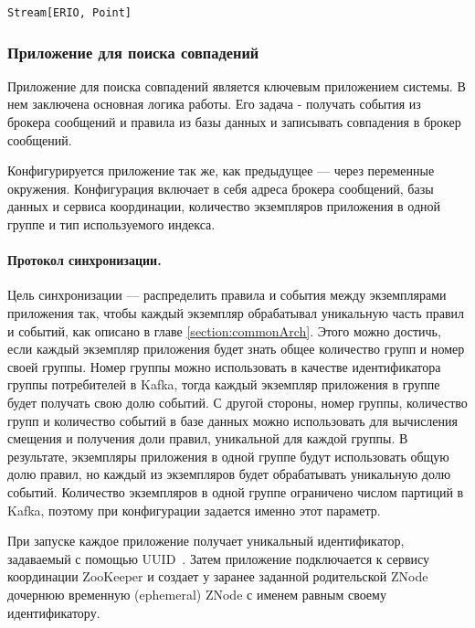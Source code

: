 \documentclass[14pt]{article}
\begin{document}
\begin{lstlisting}[style=scalaStyle,caption={Тип, описывающий поток событий.},label={listing:pointsStream},captionpos=b, float]
Stream[ERIO, Point]
\end{lstlisting}

\subsubsection{Приложение для поиска совпадений}
\label{section:classifier}

Приложение для поиска совпадений является ключевым приложением системы. В нем заключена основная логика работы. Его задача - получать события из брокера сообщений и правила из базы данных и записывать совпадения в брокер сообщений.

Конфигурируется приложение так же, как предыдущее --- через переменные окружения. Конфигурация включает в себя адреса брокера сообщений, базы данных и сервиса координации, количество экземпляров приложения в одной группе и тип используемого индекса.

\paragraph{Протокол синхронизации.} Цель синхронизации --- распределить правила и события между экземплярами приложения так, чтобы каждый экземпляр обрабатывал уникальную часть правил и событий, как описано в главе \ref{section:commonArch}. Этого можно достичь, если каждый экземпляр приложения будет знать общее количество групп и номер своей группы. Номер группы можно использовать в качестве идентификатора группы потребителей в Kafka, тогда каждый экземпляр приложения в группе будет получать свою долю событий. С другой стороны, номер группы, количество групп и количество событий в базе данных можно использовать для вычисления смещения и получения доли правил, уникальной для каждой группы. В результате, экземпляры приложения в одной группе будут использовать общую долю правил, но каждый из экземпляров будет обрабатывать уникальную долю событий. Количество экземпляров в одной группе ограничено числом партиций в Kafka, поэтому при конфигурации задается именно этот параметр.

При запуске каждое приложение получает уникальный идентификатор, задаваемый с помощью UUID~\cite{uuid}. Затем приложение подключается к сервису координации ZooKeeper и создает у заранее заданной родительской ZNode дочернюю временную (ephemeral) ZNode с именем равным своему идентификатору.
\end{document}
